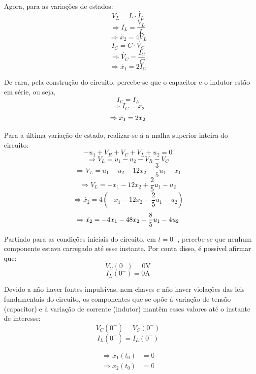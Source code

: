 \documentclass{report}
\begin{document}
Agora, para as variações de estados:
$$ V_L = L \cdot \dot{I_L} $$
$$ \Rightarrow \dot{I_L} = \frac{V_L}{L} $$
$$ \Rightarrow \dot{x_2} = 4V_L $$
$$ I_C = C \cdot \dot{V_C} $$
$$ \Rightarrow \dot{V_C} = \frac{I_C}{C} $$
$$ \Rightarrow \dot{x_1} = 2I_C $$

De cara, pela construção do circuito, percebe-se que o capacitor e o indutor estão
em série, ou seja,
$$ I_C = I_L $$
$$ \Rightarrow I_C = x_2 $$
\begin{equation}
      \label{eq:8.39_x1'}
      \centering
      \Rightarrow \dot{x_1} = 2x_2
\end{equation}

Para a última variação de estado, realizar-se-á a malha superior inteira do circuito:
$$ -u_1 + V_R + V_C + V_L + u_2 = 0 $$
$$ \Rightarrow V_L = u_1 - u_2 - V_R - V_C $$
$$ \Rightarrow V_L = u_1 - u_2 - 12x_2 - \frac{3}{5}u_1 - x_1 $$
$$ \Rightarrow V_L = - x_1 - 12x_2 + \frac{2}{5}u_1 - u_2 $$
$$ \Rightarrow \dot{x_2} = 4\left(-x_1 - 12x_2 + \frac{2}{5}u_1 - u_2\right) $$
\begin{equation}
      \label{eq:8.39_x2'}
      \centering
      \Rightarrow \dot{x_2} = -4x_1 - 48x_2 + \frac{8}{5}u_1 - 4u_2
\end{equation}

Partindo para as condições iniciais do circuito, em $ t = 0^- $, percebe-se que nenhum componente estava carregado até
esse instante. Por conta disso, é possível afirmar que:
$$ V_C(0^-) = 0\text{V} $$
$$ I_L(0^-) = 0\text{A} $$

Devido a não haver fontes impulsivas, nem chaves e não haver violações das leis fundamentais do circuito, os componentes que
se opõe à variação de tensão (capacitor) e à variação de corrente (indutor) mantêm esses valores até o instante de interesse:
$$ V_C(0^+) = V_C(0^-) $$
$$ I_L(0^+) = I_L(0^-) $$

\vspace*{-1.5\baselineskip}
\begin{center}
    \begin{align}
        \label{eq:8.39_x1_0}
        \Rightarrow x_1(t_0) &= 0 \\
        \label{eq:8.39_x2_0}
        \Rightarrow x_2(t_0) &= 0
    \end{align}
\end{center}
\end{document}
